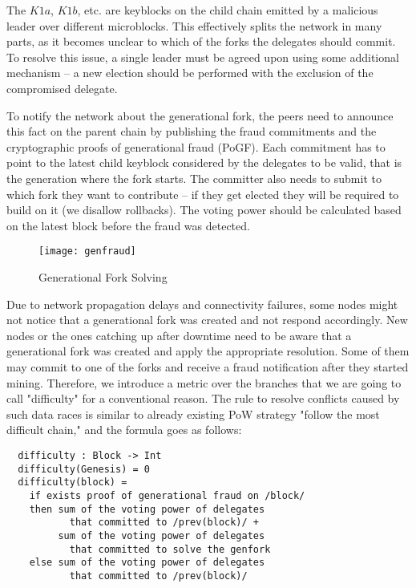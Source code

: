 The $K1a$, $K1b$, etc. are keyblocks on the child chain emitted by a malicious
leader over different microblocks. This
effectively splits the network in many parts, as it becomes unclear to which of
the forks the delegates should commit. To resolve this issue, a single leader
must be agreed upon using some additional mechanism – a new election
should be performed with the exclusion of the compromised delegate.

To notify the network about the generational fork, the peers need to announce
this fact on the parent chain by publishing the fraud commitments and the
cryptographic proofs of generational fraud (PoGF). Each commitment has to point to
the latest child keyblock considered by the delegates to be
valid, that is the generation where the fork starts. The committer also needs
to submit to which fork they want to contribute – if they get elected they
will be required to build on it (we disallow rollbacks). The voting power should be
calculated based on the latest block before the fraud was detected.


\begin{figure}[h]
	\caption{Generational Fork Solving}
	\centering
	\texttt{[image: genfraud]}
\end{figure}

Due to network propagation
delays and connectivity failures, some nodes might not notice that a generational
fork was created and not respond accordingly. New nodes or the ones catching up
after downtime need to be aware that a generational fork was created and apply
the appropriate resolution. Some of them may commit to one of the forks and receive a fraud
notification after they started mining. Therefore, we introduce a metric over the
branches that we are going to call "difficulty" for a conventional reason. The
rule to resolve conflicts caused by such data races is similar to already
existing PoW strategy "follow the most difficult chain," and the formula goes
as follows:
\begin{minipage}{\linewidth}
\begin{lstlisting}
  difficulty : Block -> Int
  difficulty(Genesis) = 0
  difficulty(block) =
    if exists proof of generational fraud on /block/
    then sum of the voting power of delegates
           that committed to /prev(block)/ +
         sum of the voting power of delegates
           that committed to solve the genfork
    else sum of the voting power of delegates
           that committed to /prev(block)/
\end{lstlisting}
\end{minipage}

